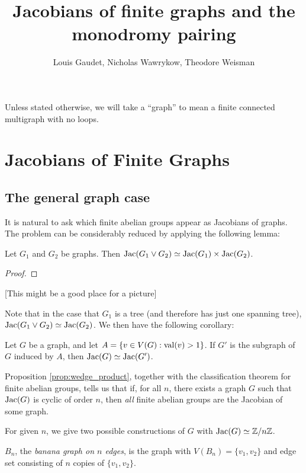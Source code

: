 \documentclass{amsart}
\title{Jacobians of finite graphs and the monodromy pairing}
\author{Louis Gaudet, Nicholas Wawrykow, Theodore Weisman}
\begin{document}
\maketitle

Unless stated otherwise, we will take a ``graph'' to mean a finite
connected multigraph with no loops.

\section{Jacobians of Finite Graphs}
\label{sec:jacobians}

\subsection{The general graph case}
It is natural to ask which finite abelian groups appear as Jacobians
of graphs. The problem can be considerably reduced by applying the
following lemma:

\begin{prop}
\label{prop:wedge_product}
Let $G_1$ and $G_2$ be graphs. Then $\operatorname{Jac}(G_1 \vee G_2) \simeq
\operatorname{Jac}(G_1) \times \operatorname{Jac}(G_2)$.
\end{prop}
\begin{proof}




\end{proof}

[This might be a good place for a picture]

Note that in the case that $G_1$ is a tree (and therefore has just one
spanning tree), $\operatorname{Jac}(G_1 \vee G_2) \simeq \operatorname{Jac}(G_2)$. We then have
the following corollary:
\begin{cor}
  \label{cor:1_valent}
  Let $G$ be a graph, and let $A = \{v \in V(G) : \operatorname{val}(v) > 1\}$. If
  $G'$ is the subgraph of $G$ induced by $A$, then $\operatorname{Jac}(G) \simeq
  \operatorname{Jac}(G')$.
\end{cor}

Proposition \ref{prop:wedge_product}, together with the classification
theorem for finite abelian groups, tells us that if, for all $n$,
there exists a graph $G$ such that $\operatorname{Jac}(G)$ is cyclic of order $n$,
then \emph{all} finite abelian groups are the Jacobian of some graph.

For given $n$, we give two possible constructions of $G$ with $\operatorname{Jac}(G)
\simeq \mathbb{Z}/n\mathbb{Z}$.

\begin{defn}
  $B_n$, the \emph{banana graph on $n$ edges}, is the graph with
  $V(B_n) = \{v_1, v_2\}$ and edge set consisting of $n$ copies of
  $\{v_1, v_2\}$.
\end{defn}
\end{document}
